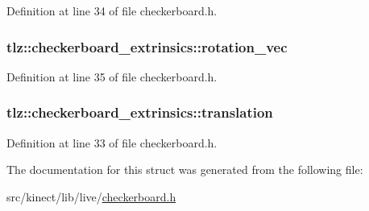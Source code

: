 Definition at line 34 of file checkerboard.\+h.

\subsubsection[{\texorpdfstring{rotation\+\_\+vec}{rotation_vec}}]{ tlz\+::checkerboard\+\_\+extrinsics\+::rotation\+\_\+vec}\hypertarget{structtlz_1_1checkerboard__extrinsics_a690e1d1996a72bb51764cce791dfef21}{}\label{structtlz_1_1checkerboard__extrinsics_a690e1d1996a72bb51764cce791dfef21}


Definition at line 35 of file checkerboard.\+h.

\subsubsection[{\texorpdfstring{translation}{translation}}]{ tlz\+::checkerboard\+\_\+extrinsics\+::translation}\hypertarget{structtlz_1_1checkerboard__extrinsics_acd8a8a641bef6a88474b62348d8afb91}{}\label{structtlz_1_1checkerboard__extrinsics_acd8a8a641bef6a88474b62348d8afb91}


Definition at line 33 of file checkerboard.\+h.



The documentation for this struct was generated from the following file\+:\begin{DoxyCompactItemize}
\item 
src/kinect/lib/live/\hyperlink{checkerboard_8h}{checkerboard.\+h}\end{DoxyCompactItemize}
